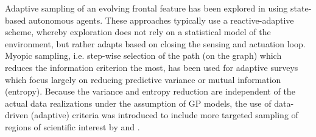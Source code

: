 \documentclass[aoas]{imsart}
\begin{document}
Adaptive sampling of an evolving frontal feature has been explored in
\cite{fronts11,Zhang2012,Pinto2018,costa19} using state-based autonomous
agents. These approaches typically use a reactive-adaptive scheme,
whereby exploration does not rely on a statistical model of the
environment, but rather adapts based on closing the sensing and
actuation loop. Myopic sampling, i.e. step-wise selection of the path
(on the graph) which reduces the information criterion the most, has
been used for adaptive surveys \citep{singh2009efficient,Binney2013}
which focus largely on reducing predictive variance or mutual
information (entropy). Because the variance and entropy reduction are
independent of the actual data realizations under the assumption of GP
models, the use of data-driven (adaptive) criteria was introduced to
include more targeted sampling of regions of scientific interest by
\cite{Low2009} and \cite{fossuminformation}.





\end{document}
